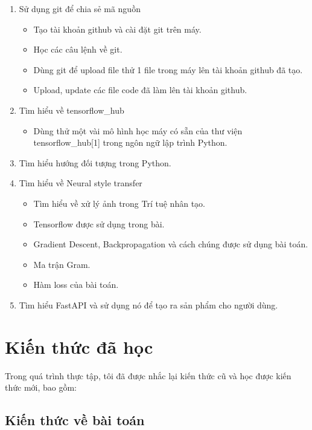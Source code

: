\documentclass{article}
\begin{document}
\begin{enumerate}
\item Sử dụng git để chia sẻ mã nguồn
\begin{itemize}
\item Tạo tài khoản github và cài đặt git trên máy.
\item Học các câu lệnh về git.
\item Dùng git để upload file thử 1 file trong máy lên tài khoản github đã tạo.
\item Upload, update các file code đã làm lên tài khoản github.
\end{itemize}

\item Tìm hiểu về tensorflow\_hub
\begin{itemize}
    \item Dùng thử một vài mô hình học máy có sẵn của thư viện tensorflow\_hub[1] trong ngôn ngữ lập trình Python.
\end{itemize}

\item Tìm hiểu hướng đối tượng trong Python.

\item Tìm hiểu về Neural style transfer 
\begin{itemize}
    \item Tìm hiểu về xử lý ảnh trong Trí tuệ nhân tạo.
    \item Tensorflow được sử dụng trong bài.
    \item Gradient Descent, Backpropagation và cách chúng được sử dụng bài toán.
    \item Ma trận Gram.
    \item Hàm loss của bài toán.
\end{itemize}

\item Tìm hiểu FastAPI và sử dụng nó để tạo ra sản phẩm cho người dùng.
\end{enumerate}


\section{Kiến thức đã học}

Trong quá trình thực tập, tôi đã được nhắc lại kiến thức cũ và học được kiến thức mới, bao gồm:
\vspace{1cm}
\subsection{Kiến thức về bài toán}
\end{document}
